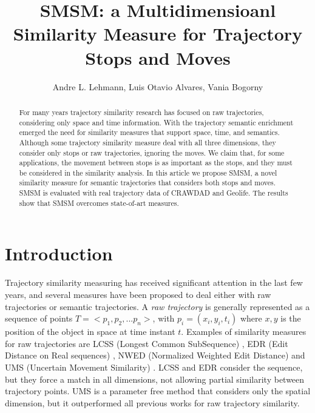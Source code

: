 \documentclass[12pt]{article}
\title{SMSM: a Multidimensioanl Similarity Measure for Trajectory Stops and Moves}
\author{Andre L. Lehmann\inst{1}, Luis Otavio Alvares\inst{1}, Vania Bogorny\inst{1} }
\begin{document}
 

\maketitle

\begin{abstract}
For many years trajectory similarity research has focused on raw trajectories, considering only space and time information. With the trajectory semantic enrichment emerged the need for similarity measures that support space, time, and semantics. Although some trajectory similarity measure deal with all three dimensions, they consider only stops or raw trajectories, ignoring the moves. We claim that, for some applications, the movement between stops is as important as the stops, and they must be considered in the similarity analysis.
  In this article we propose SMSM, a novel similarity measure for semantic trajectories that considers both stops and moves.
  SMSM is evaluated with real trajectory data of CRAWDAD and Geolife. The results show that SMSM overcomes state-of-art measures.
\end{abstract}

\section{Introduction}

Trajectory similarity measuring has received significant attention in the last few years, and several measures have been proposed {to deal either with raw trajectories or semantic trajectories}. A \emph{raw trajectory} is generally represented as a sequence of points $T=<p_1, p_2, ...p_n>$, with $p_i=(x_i,y_i,t_i)$ where $x,y$ is the position of the object in space at time instant $t$.  Examples of similarity measures for raw trajectories are LCSS (Longest Common SubSequence) \citep{vlachos2002discovering}, EDR (Edit Distance on Real sequences) \citep{Chen:2005:RFS:1066157.1066213}, NWED (Normalized Weighted Edit Distance) \citep{dodge2012} and UMS (Uncertain Movement Similarity) \citep{Furtado-UMS-2018}. LCSS \citep{vlachos2002discovering} and EDR \citep{Chen:2005:RFS:1066157.1066213} consider the sequence, but they force a match in all dimensions, not allowing partial similarity between trajectory points.  %
UMS \citep{Furtado-UMS-2018} is a parameter free method that considers only the spatial dimension, but it outperformed all previous works for raw trajectory similarity.
\end{document}
